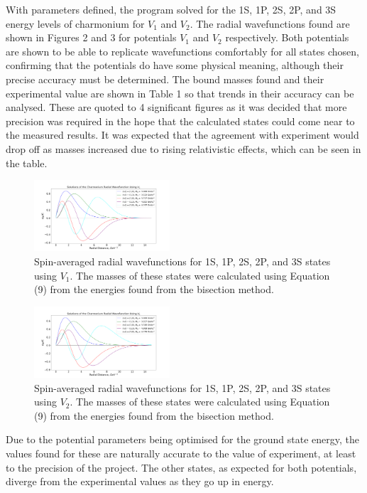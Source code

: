 \documentclass[10pt, twocolumn]{article}
\begin{document}
With parameters defined, the program solved for the 1S, 1P, 2S, 2P, and 3S energy levels of charmonium for $V_1$ and $V_2$.
The radial wavefunctions found are shown in Figures 2 and 3 for potentials $V_1$ and $V_2$ respectively. 
Both potentials are shown to be able to replicate wavefunctions comfortably for all states chosen, confirming that the potentials do have some physical meaning, although their precise accuracy must be determined.
The bound masses found and their experimental value are shown in Table 1 so that trends in their accuracy can be analysed. 
These are quoted to 4 significant figures as it was decided that more precision was required in the hope that the calculated states could come near to the measured results.
It was expected that the agreement with experiment would drop off as masses increased due to rising relativistic effects, which can be seen in the table. 
\begin{figure}[H]
    \centering
    \includegraphics[width=0.45\textwidth]{fullspec}
    \caption{Spin-averaged radial wavefunctions for 1S, 1P, 2S, 2P, and 3S states using $V_1$. The masses of these states were calculated using Equation (9) from the energies found from the bisection method.}
\end{figure}
\begin{figure}[H]
    \centering
    \includegraphics[width=0.45\textwidth]{fullspec2}
    \caption{Spin-averaged radial wavefunctions for 1S, 1P, 2S, 2P, and 3S states using $V_2$. The masses of these states were calculated using Equation (9) from the energies found from the bisection method.}
\end{figure}
Due to the potential parameters being optimised for the ground state energy, the values found for these are naturally accurate to the value of experiment, at least to the precision of the project.
The other states, as expected for both potentials, diverge from the experimental values as they go up in energy. 
\end{document}

